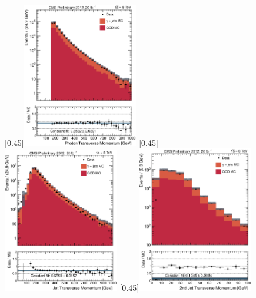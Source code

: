 \begin{figure}[p]
    \centering
    \subcaptionbox{\label{pt_photon}}[0.45\textwidth]{\includegraphics[width=0.45\textwidth]{chapitre4/figs/ptPhoton_passedID_log.eps}}\hfill
    \subcaptionbox{\label{pt_first_jet}}[0.45\textwidth]{\includegraphics[width=0.45\textwidth]{chapitre4/figs/ptFirstJet_passedID_log.eps}}
    \subcaptionbox{\label{pt_second_jet}}[0.45\textwidth]{\includegraphics[width=0.45\textwidth]{chapitre4/figs/ptSecondJet_passedID_log.eps}}\hfill

\end{figure}
